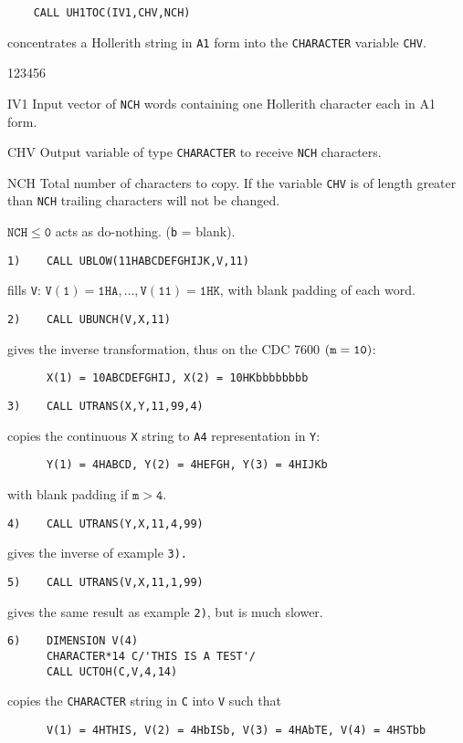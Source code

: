\begin{verbatim}
    CALL UH1TOC(IV1,CHV,NCH)
\end{verbatim}
concentrates a Hollerith string in {\tt A1} form
into the {\tt CHARACTER} variable {\tt CHV}.
\begin{DLtt}{123456}
\item [IV1] Input vector of {\tt NCH} words containing one Hollerith
character each in A1 form.
\item [CHV] Output variable of type {\tt CHARACTER} to receive {\tt NCH}
characters.
\item [NCH] Total number of characters to copy. If the
variable {\tt CHV} is of length greater than
{\tt NCH} trailing characters will not be changed.
\end{DLtt}
\Errorh
$\mathtt{NCH \leq 0}$ acts as do-nothing.
\Examples
({\tt b} = blank).
\begin{verbatim}
1)    CALL UBLOW(11HABCDEFGHIJK,V,11)
\end{verbatim}
fills {\tt V}: $\mathtt{V(1) = 1HA, \ldots, V(11) = 1HK}$,
with blank padding of each word.
\begin{verbatim}
2)    CALL UBUNCH(V,X,11)
\end{verbatim}
gives the inverse transformation, thus on the CDC 7600 $({\tt m=10})$:
\begin{verbatim}
      X(1) = 10ABCDEFGHIJ, X(2) = 10HKbbbbbbbb
\end{verbatim}
\begin{verbatim}
3)    CALL UTRANS(X,Y,11,99,4)
\end{verbatim}
copies the continuous {\tt X} string to {\tt A4} representation in
{\tt Y}:
\begin{verbatim}
      Y(1) = 4HABCD, Y(2) = 4HEFGH, Y(3) = 4HIJKb
\end{verbatim}
with blank padding if $\mathtt{m > 4}$.
\begin{verbatim}
4)    CALL UTRANS(Y,X,11,4,99)
\end{verbatim}
gives the inverse of example {\tt 3).}
\begin{verbatim}
5)    CALL UTRANS(V,X,11,1,99)
\end{verbatim}
gives the same result as example {\tt 2)}, but is much slower.
\begin{verbatim}
6)    DIMENSION V(4)
      CHARACTER*14 C/'THIS IS A TEST'/
      CALL UCTOH(C,V,4,14)
\end{verbatim}
copies the {\tt CHARACTER} string in {\tt C} into {\tt V} such that
\begin{verbatim}
      V(1) = 4HTHIS, V(2) = 4HbISb, V(3) = 4HAbTE, V(4) = 4HSTbb
\end{verbatim}
